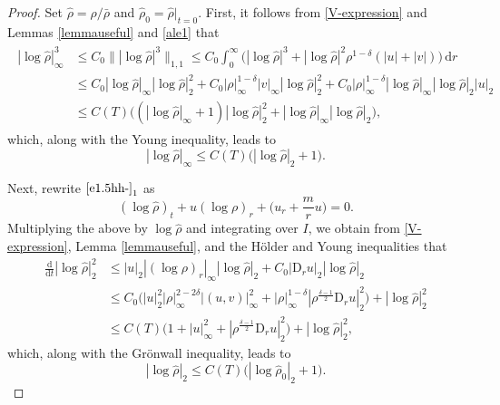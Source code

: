 \documentclass[11pt,reqno]{amsart}
\numberwithin{rk}{section}
\numberwithin{prop}{section}
\numberwithin{mydef}{section}
\numberwithin{lem}{section}
\numberwithin{equation}{section}
\numberwithin{thm}{section}
\begin{document}
\begin{proof}
Set $\hat\rho=\rho/\bar\rho$ and $\hat\rho_0=\hat\rho|_{t=0}$. First, it follows from \eqref{V-expression} and Lemmas \ref{lemmauseful} and \ref{ale1} that
\begin{align*}
\begin{aligned}
|\log\hat\rho|_\infty^3
&\leq C_0\big\||\log\hat\rho|^3\big\|_{1,1}\leq C_0\int_0^\infty\big(|\log\hat\rho|^3+|\log\hat\rho|^2\rho^{1-\delta}(|u|+|v|)\big)\,\mathrm{d}r\\
&\leq C_0|\log\hat\rho|_\infty|
\log\hat\rho|_2^2+C_0|\rho|_\infty^{1-\delta}|v|_\infty|
\log\hat\rho|_2^2 +C_0 |\rho|_\infty^{1-\delta}|\log\hat\rho|_\infty|\log\hat\rho|_2|u|_2\\
&\leq C(T)\big((|\log\hat\rho|_\infty+1)
|\log\hat\rho|_2^2+ |\log\hat\rho|_\infty|\log\hat\rho|_2\big),
\end{aligned}
\end{align*}
which, along with the Young inequality, leads to
\begin{equation}\label{wuqiong-log-42}
|\log\hat\rho|_\infty\leq C(T)\big(|\log\hat\rho|_2+1\big).   
\end{equation}

Next, rewrite $\eqref{e1.5hh-}_1$ as
\begin{equation*} 
(\log\hat\rho)_t+u(\log\rho)_r+\big(u_r+\frac{m}{r}u\big)=0.
\end{equation*}
Multiplying the above by $\log\hat\rho$ and integrating over $I$, we obtain from \eqref{V-expression}, Lemma \ref{lemmauseful}, and the H\"older and Young inequalities that
\begin{equation*}
\begin{aligned}
\frac{\mathrm{d}}{\mathrm{d}t}|\log\hat\rho|_2^2&\leq |u|_2|(\log\rho)_r|_\infty|\log\hat\rho|_2
+C_0|\mathrm{D}_r u|_2|\log\hat\rho|_2\\
&\leq C_0\big(|u|_2^2|\rho|_\infty^{2-2\delta}|(u,v)|_\infty^2+|\rho|_\infty^{1-\delta}|\rho^\frac{\delta-1}{2}\mathrm{D}_r u|_2^2\big)+|\log\hat\rho|_2^2\\
&\leq C(T)\big(1+|u|_\infty^2+|\rho^\frac{\delta-1}{2}\mathrm{D}_r u|_2^2\big)+|\log\hat\rho|_2^2,
\end{aligned}
\end{equation*}
which, along with the Gr\"onwall inequality, leads to
\begin{equation}\label{324-po}
|\log\hat\rho|_2\leq C(T)\big(|\log\hat\rho_0|_2+1\big).
\end{equation}


\end{proof}
\end{document}

